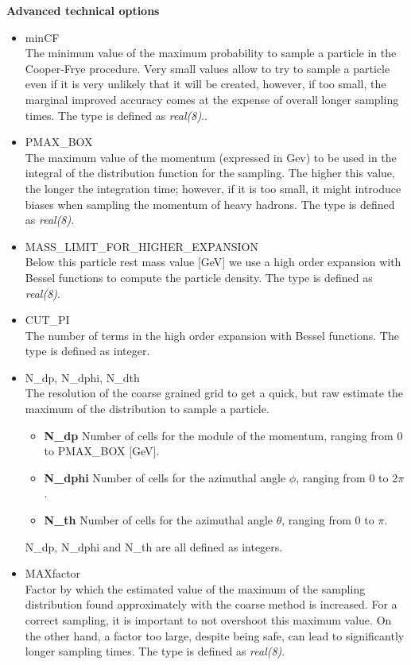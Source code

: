 \documentclass[12pt, a4paper]{report}
\begin{document}
\vspace*{2mm}
\begin{center}
    \textbf{Advanced technical options}
\end{center}
\begin{itemize}
    \item {\color{PineGreen}minCF}\\
        The minimum value of the maximum probability to sample a particle in the Cooper-Frye procedure. Very small values allow to try to sample a particle even if it is very unlikely that it will be created, however, if too small, the marginal improved accuracy comes at the expense of overall longer sampling times. The type is defined as \emph{real(8)}..
    \item {\color{PineGreen}PMAX\_BOX}\\
        The maximum value of the momentum (expressed in Gev) to be used in the integral of the distribution function for the sampling. The higher this value, the longer the integration time; however, if it is too small, it might introduce biases when sampling the momentum of heavy hadrons. The type is defined as \emph{real(8)}.
    \item {\color{PineGreen}MASS\_LIMIT\_FOR\_HIGHER\_EXPANSION}\\
        Below this particle rest mass value [GeV] we use a high order expansion with Bessel functions to compute the particle density. The type is defined as \emph{real(8)}.
    \item {\color{PineGreen}CUT\_PI}\\
        The number of terms in the high order expansion with Bessel functions. The type is defined as integer.
    \item {\color{PineGreen}N\_dp, N\_dphi, N\_dth}\\
        The resolution of the coarse grained grid to get a quick, but raw estimate the maximum of the distribution to sample a particle.
        \begin{itemize}
            \item \textbf{N\_dp} Number of cells for the module of the momentum, ranging from 0 to PMAX\_BOX [GeV].
            \item \textbf{N\_dphi} Number of cells for the azimuthal angle $\phi$, ranging from 0 to 2$\pi$.
            \item \textbf{N\_th} Number of cells for the azimuthal angle $\theta$, ranging from 0 to $\pi$.
        \end{itemize}
        N\_dp, N\_dphi and N\_th are all defined as integers.     
    \item {\color{PineGreen}MAXfactor}\\
        Factor by which the estimated value of the maximum of the sampling distribution found approximately with the coarse method is increased. For a correct sampling, it is important to not overshoot this maximum value. On the other hand, a factor too large, despite being safe, can lead to significantly longer sampling times. The type is defined as \emph{real(8)}.        
\end{itemize}
\end{document}
